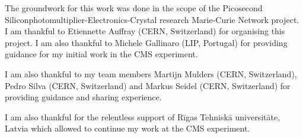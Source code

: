 The groundwork for this work was done in the scope of the Picosecond Siliconphotomultiplier-Electronics-Crystal research Marie-Curie Network project. I am thankful to Etiennette Auffray (CERN, Switzerland) for organising this project. I am also thankful to Michele Gallinaro (LIP, Portugal) for providing guidance for my initial work in the CMS experiment.

I am also thankful to my team members Martijn Mulders (CERN, Switzerland), Pedro Silva (CERN, Switzerland) and Markus Seidel (CERN, Switzerland) for providing guidance and sharing experience.

I am also thankful for the relentless support of Rīgas Tehniskā universitāte, Latvia which allowed to continue my work at the CMS experiment.

